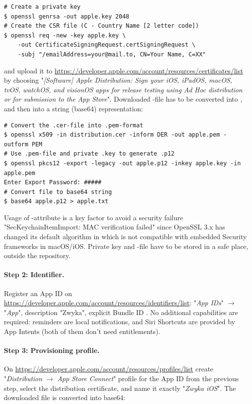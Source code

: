 \begin{lstlisting}[language=terminal]
# Create a private key
$ openssl genrsa -out apple.key 2048
# Create the CSR file (C - Country Name [2 letter code])
$ openssl req -new -key apple.key \
    -out CertificateSigningRequest.certSigningRequest \
    -subj "/emailAddress=your@mail.to, CN=Your Name, C=XX"
\end{lstlisting}

\noindent and upload it to
\href{https://developer.apple.com/account/resources/certificates/list}{https://developer.apple.com/account/resources/certificates/list}
by choosing "\emph{[Software] Apple Distribution: Sign your iOS, iPadOS, macOS, tvOS, watchOS, and visionOS apps for
release testing using Ad Hoc distribution or for submission to the App Store}". Downloaded \q{.cer}-file has to be
converted into \q{.p12}, and then into a string (base64) representation:

\begin{lstlisting}[language=terminal]
# Convert the .cer-file into .pem-format
$ openssl x509 -in distribution.cer -inform DER -out apple.pem -outform PEM
# Use .pem-file and private .key to generate .p12
$ openssl pkcs12 -export -legacy -out apple.p12 -inkey apple.key -in apple.pem
Enter Export Password: #####
# Convert file to base64 string
$ base64 apple.p12 > apple.txt
\end{lstlisting}

\noindent Usage of -attribute is a key factor to avoid a security failure "SecKeychainItemImport: MAC
verification failed" since OpenSSL 3.x has changed its default algorithm in  which is not compatible with
embedded Security frameworks in macOS/iOS. Private key and \q{.p12}-file have to be stored in a safe place, outside the
repository.

\paragraph{Step 2: Identifier.} Register an App ID on
\href{https://developer.apple.com/account/resources/identifiers/list}{https://developer.apple.com/account/resources/identifiers/list}:
"\emph{App IDs}" $\rightarrow$ "\emph{App}", description "Zwyka", explicit Bundle ID . No additional
capabilities are required: reminders are local notifications, and Siri Shortcuts are provided by App Intents (both
of them don't need entitlements).

\paragraph{Step 3: Provisioning profile.} On
\href{https://developer.apple.com/account/resources/profiles/list}{https://developer.apple.com/account/resources/profiles/list}
create "\emph{Distribution} $\rightarrow$ \emph{App Store Connect}" profile for the App ID from the previous step, select
the distribution certificate, and name it exactly "\emph{Zwyka iOS}". The downloaded file is converted into base64:

